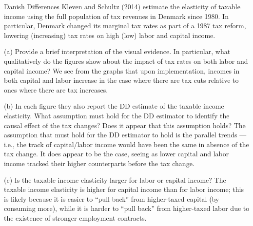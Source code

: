 \documentclass[10pt]{extarticle}
\begin{document}
  \begin{problem}{Danish Differences}
    Kleven and Schultz (2014) estimate the elasticity of taxable income using the full population of tax revenues in Denmark since 1980. In particular, Denmark changed its marginal tax rates as part of a 1987 tax reform, lowering (increasing) tax rates on high (low) labor and capital income.
    \begin{problem}{(a)}
      Provide a brief interpretation of the visual evidence. In particular, what qualitatively do the figures show about the impact of tax rates on both labor and capital income?
      \tcblower
      We see from the graphs that upon implementation, incomes in both capital and labor increase in the case where there are tax cuts relative to ones where there are tax increases.
    \end{problem}
    \begin{problem}{(b)}
      In each figure they also report the DD estimate of the taxable income elasticity. What assumption must hold for the DD estimator to identify the causal effect of the tax changes? Does it appear that this assumption holds?
      \tcblower
      The assumption that must hold for the DD estimator to hold is the parallel trends --- i.e., the track of capital/labor income would have been the same in absence of the tax change. It does appear to be the case, seeing as lower capital and labor income tracked their higher counterparts before the tax change.
    \end{problem}
    \begin{problem}{(c)}
      Is the taxable income elasticity larger for labor or capital income?
      \tcblower
      The taxable income elasticity is higher for capital income than for labor income; this is likely because it is easier to ``pull back'' from higher-taxed capital (by consuming more), while it is harder to ``pull back'' from higher-taxed labor due to the existence of stronger employment contracts.
    \end{problem}
  \end{problem}
\end{document}

